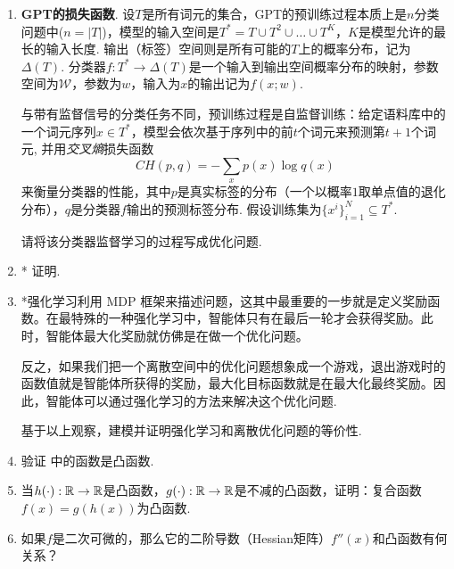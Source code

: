 \begin{enumerate}[wide, labelindent=0pt]
    \item \textbf{GPT的损失函数}. 设$T$是所有词元的集合，GPT的预训练过程本质上是$n$分类问题中($n = |T|$)，模型的输入空间是$T^\ast=T\cup T^2 \cup \dots \cup T^K$，$K$是模型允许的最长的输入长度. 输出（标签）空间则是所有可能的$T$上的概率分布，记为$\Delta(T)$. 分类器$f:T^\ast \to \Delta(T)$是一个输入到输出空间概率分布的映射，参数空间为$\mathcal W$，参数为$w$，输入为$x$的输出记为$f(x;w)$. 
    
    与带有监督信号的分类任务不同，预训练过程是自监督训练：给定语料库中的一个词元序列$x \in T^\ast$，模型会依次基于序列中的前$t$个词元来预测第$t+1$个词元, 并用\textit{交叉熵}损失函数
    \[CH(p,q) = -\sum_{x} p(x)\log q(x)\]
    来衡量分类器的性能，其中$p$是真实标签的分布（一个以概率$1$取单点值的退化分布），$q$是分类器$f$输出的预测标签分布. 假设训练集为$\{x^i\}_{i=1}^N\subseteq T^\ast$. 
    
    请将该分类器监督学习的过程写成优化问题.
    \item *\label{exercise:no-free-lunch} 证明.
    
    \item *强化学习利用 MDP 框架来描述问题，这其中最重要的一步就是定义奖励函数。在最特殊的一种强化学习中，智能体只有在最后一轮才会获得奖励。此时，智能体最大化奖励就仿佛是在做一个优化问题。
    
    反之，如果我们把一个离散空间中的优化问题想象成一个游戏，退出游戏时的函数值就是智能体所获得的奖励，最大化目标函数就是在最大化最终奖励。因此，智能体可以通过强化学习的方法来解决这个优化问题. 
    
    基于以上观察，建模并证明强化学习和离散优化问题的等价性.
    
    \item \label{exercise:convex-function} 验证 中的函数是凸函数.
    
    \item \label{exercise:convex-operation} 当$h(\cdot):\mathbb{R}\to\mathbb{R}$是凸函数，$g(\cdot):\mathbb{R}\to\mathbb{R}$是不减的凸函数，证明：复合函数$f(x) = g(h(x))$为凸函数.
    
    \item 如果$f$是二次可微的，那么它的二阶导数（Hessian矩阵）$f''(x)$和凸函数有何关系？


\end{enumerate}
